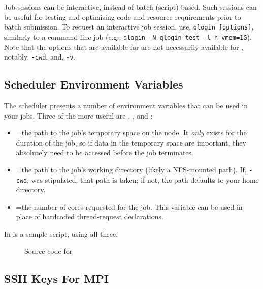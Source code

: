 \documentclass{easychair}
\begin{document}
Job sessions can be interactive, instead of batch (script) based. Such 
sessions can be useful for testing and optimising code and resource 
requirements prior to batch submission. To request an interactive job 
session, use, \texttt{qlogin [options]}, similarly to a 
 command-line job (e.g., \texttt{qlogin -N qlogin-test -l h\_vmem=1G}).
Note that the options that are available for  are not necessarily
available for , notably, \texttt{-cwd}, and, \texttt{-v}. 

\subsection{Scheduler Environment Variables}

The scheduler presents a number of environment variables that can be used in 
your jobs. Three of the more useful are , , 
and :

\begin{itemize}
\item
{}=the path to the job's temporary space on the node. It \emph{only} exists for the duration of the job, so if data in the temporary space are important, they absolutely need to be accessed before the job terminates.

\item
{}=the path to the job's working directory (likely a NFS-mounted path). If, \texttt{-cwd}, was stipulated, that path is taken; if not, the path defaults to your home directory.

\item
{}=the number of cores requested for the job. This variable can be used in place of hardcoded thread-request declarations. 
\end{itemize}

\noindent
In  is a sample script, using all three.

\begin{figure}[htpb]
    
    \caption{Source code for }
	\label{fig:tmpdir.sh}
\end{figure}


\subsection{SSH Keys For MPI}
\end{document}
